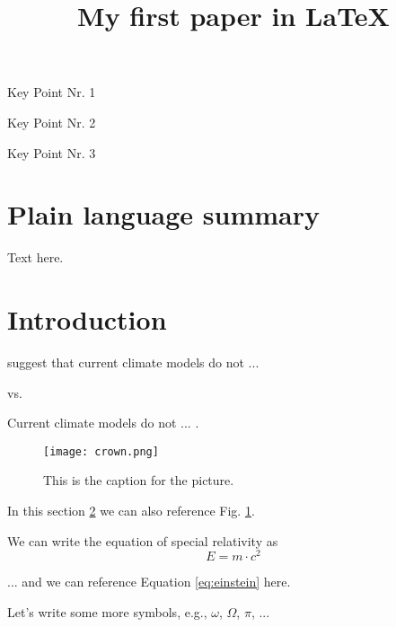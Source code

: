 \documentclass{agujournal2019}
\begin{document}
\title{My first paper in LaTeX}
\begin{keypoints}
\item Key Point Nr. 1
\item Key Point Nr. 2
\item Key Point Nr. 3
\end{keypoints}


\begin{abstract}
\lipsum[5]
\end{abstract} 

\section{Plain language summary}
Text here.
\pagebreak
\section{Introduction} \label{sec:intro}
 suggest that current climate models do not ...

vs. 

Current climate models do not ... \cite{huguenin2020frequency}.

\begin{figure}[!htb] 
    \centering \texttt{[image: crown.png]}
	\caption{This is the caption for the picture.}
	\label{fig:calm}
\end{figure}

In this section \ref{sec:intro} we can also reference Fig. \ref{fig:calm}.

We can write the equation of special relativity as
\begin{equation}
    E = m \cdot c^2
    \label{eq:einstein}
\end{equation}

... and we can reference Equation \ref{eq:einstein} here.

Let's write some more symbols, e.g., $\omega$, $\Omega$, $\pi$, ...
\end{document}
